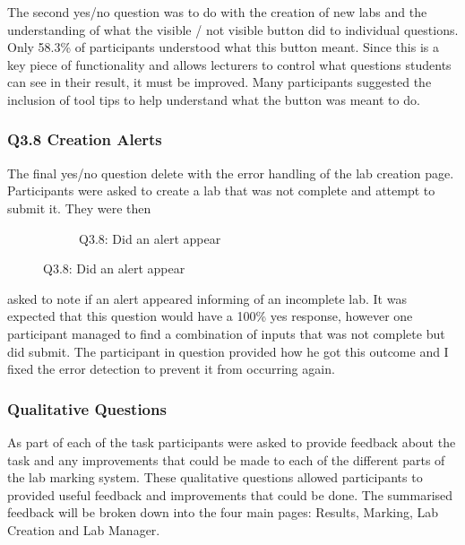 \documentclass[12pt]{article}  %
\begin{document}
The second yes/no question was to do with the creation of new labs and the understanding of what the visible / not visible button did to individual questions. Only 58.3\% of participants understood what this button meant. Since this is a key piece of functionality and allows lecturers to control what questions students can see in their result, it must be improved. Many participants suggested the inclusion of tool tips to help understand what the button was meant to do. 


\subsubsection*{Q3.8 Creation Alerts}



The final yes/no question delete with the error handling of the lab creation page. Participants were asked to create a lab that was not complete and attempt to submit it. They were then

\begin{figure}
\vspace*{-\baselineskip}
\begin{figure}[H]
\caption{Q3.8: Did an alert appear}


\end{figure}
\end{figure}

\noindent asked to note if an alert appeared informing of an incomplete lab. It was expected that this question would have a 100\% yes response, however one participant managed to find a combination of inputs that was not complete but did submit. The participant in question provided how he got this outcome and I fixed the error detection to prevent it from occurring again.


\subsubsection{Qualitative Questions}

As part of each of the task participants were asked to provide feedback about the task and any improvements that could be made to each of the different parts of the lab marking system. These qualitative questions allowed participants to provided useful feedback and improvements that could be done. The summarised feedback will be broken down into the four main pages: Results, Marking, Lab Creation and Lab Manager.
\end{document}
